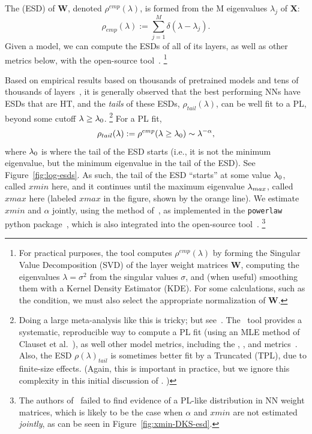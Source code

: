 \noindent
The \EmpiricalSpectralDensity (ESD) of $\mathbf{W}$, denoted $\rho^{emp}(\lambda)$, is formed from the M eigenvalues $\lambda_{j}$ of $\mathbf{X}$:
\begin{equation}
\rho_{emp}(\lambda):=\sum_{j=1}^{M}\delta(\lambda-\lambda_{j}) .
\label{eqn:rho}
\end{equation}
Given a model, we can compute the ESDs of all of its layers, as well as other metrics below,
with the open-source \WW tool~\cite{WW}.%
\footnote{For practical purposes, the \WW tool computes $\rho^{emp}(\lambda)$ by forming the Singular Value Decomposition (SVD) of the layer weight matrices $\mathbf{W}$, computing the eigenvalues $\lambda=\sigma^{2}$ from the singular values $\sigma$, and (when useful) smoothing them with a Kernel Density Estimator (KDE). For some calculations, such as the \TRACELOG condition, we must also select the appropriate normalization of $\mathbf{W}$.}


Based on empirical results based on thousands of pretrained models and tens of thousands of layers~\cite{MM18_TR_JMLRversion,MM20a_trends_NatComm,MM21a_simpsons_TR,YTHx23_KDD}, 
it is generally observed that the 
best performing NNs have ESDs that are HT, and the \emph{tails} of these ESDs, $\rho_{tail}(\lambda)$, can be well fit to a PL, beyond some cutoff $\lambda\ge\lambda_{0}$.%
\footnote{Doing a large meta-analysis like this is tricky; but see~\cite{MM18_TR_JMLRversion,MM20a_trends_NatComm,MM21a_simpsons_TR,YTHx23_KDD}.  The \WW~tool provides a systematic, reproducible way to compute a PL fit (using an MLE method of Clauset et al.~\cite{CSN09_powerlaw}), as well other model metrics, including the \SPECTRALNORM, \RANDDIST, and \ALPHAHAT metrics~\cite{MM20a_trends_NatComm}.  Also, the ESD $\rho(\lambda)_{tail}$ is sometimes better fit by a Truncated \PowerLaw (TPL), due to finite-size effects.
(Again, this is important in practice, but we ignore this complexity in this initial discussion of \SETOL. ) }
For a PL fit,
\begin{equation}
\rho_{tail}(\lambda):=\rho^{emp}(\lambda\ge\lambda_{0})\sim\lambda^{-\alpha} ,
\label{eqn:rho_tail}
\end{equation}
where $\lambda_{0}$ is where the tail of the ESD starts (i.e., it is not the minimum eigenvalue, but the minimum eigenvalue in the tail of the ESD). 
See Figure~\ref{fig:log-esds}.
As such, the tail of the ESD ``starts'' at some value $\lambda_{0}$, called $xmin$ here, and it continues until the 
maximum eigenvalue $\lambda_{max}$, called $xmax$ here
(labeled $xmax$ in the figure, shown by the orange line).
We estimate $xmin$ and $\alpha$ jointly, using the method of~\cite{CSN09_powerlaw}, 
as implemented in the \texttt{powerlaw} python package~\cite{ABP14}, 
which is also integrated into the open-source \WW tool~\cite{MM20a_trends_NatComm, WW}.%
\footnote{The authors of~\cite{Thamm2022} failed to find evidence of a PL-like distribution in NN weight matrices, which is 
likely to be the case when $\alpha$ and $xmin$ are not estimated \emph{jointly}, as can be seen in Figure~\ref{fig:xmin-DKS-esd}.  }


